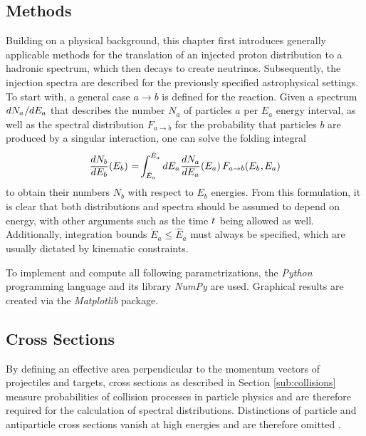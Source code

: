 \begin{spacing}{0.975}
	\chapter{Methods}
	\label{ch:methods}
	
	Building on a physical background, this chapter first introduces generally applicable methods for the translation of an
	injected proton distribution to a hadronic spectrum, which then decays to create neutrinos. Subsequently, the injection
	spectra are described for the previously specified astrophysical settings. To start with, a general case $a \rightarrow b$
	is defined for the reaction. Given a spectrum $dN_a \kern+0.5pt / \kern-0.25pt dE_a$ that describes the number $N_a$ of
	particles $a$ per $E_a$ energy interval, as well as the spectral distribution $F_{a \rightarrow b}$ for the probability
	that particles $b$ are produced by a singular interaction, one can solve the folding integral
	\begin{equation}
		\frac{dN_b}{\raisebox{0.5ex}{$dE_b$}} (E_b) \kern+0.5pt = \kern-1.5pt\int_{\check{E}_a}^{\hat{E}_a} dE_a
		\kern+0.5pt \frac{dN_a}{\raisebox{0.5ex}{$dE_a$}} (E_a) \kern+1.5pt F_{a \rightarrow b} (E_b \kern+0.5pt, \kern-0.5pt E_a)
		\label{eqn:folding}
	\end{equation}
	to obtain their numbers $N_b$ with respect to $E_b$ energies. From this formulation, it is clear that both distributions
	and spectra should be assumed to depend on energy, with other arguments such as the time $t \kern+0.5pt$ being allowed as
	well. Additionally, integration bounds $\check{E}_a \leq \hat{E}_a$ must always be specified, which are usually dictated by
	kinematic constraints.
	
	To implement and compute all following parametrizations, the \emph{Python} programming language and its library \emph{NumPy}
	are used. Graphical results are created via the \emph{Matplotlib} package.
	
	
	
	\section{Cross Sections}
	\label{sec:cross}
	
	By defining an effective area perpendicular to the momentum vectors of projectiles and targets, cross sections as described
	in Section \ref{sub:collisions} measure probabilities of collision processes in particle physics and are therefore required
	for the calculation of spectral distributions. Distinctions of particle and antiparticle cross sections vanish at high
	energies and are therefore omitted \cite{pdg}.
	

\end{spacing}
